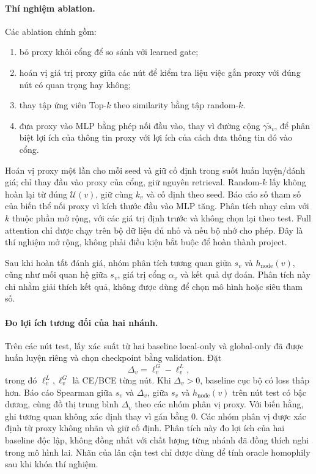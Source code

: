 \documentclass[12pt,a4paper]{article}
\numberwithin{equation}{section}
\theoremstyle{definition}
\begin{document}
\paragraph{Thí nghiệm ablation.}
Các ablation chính gồm:
\begin{enumerate}
    \item bỏ proxy khỏi cổng để so sánh với learned gate;
    \item hoán vị giá trị proxy giữa các nút để kiểm tra liệu việc gắn
    proxy với đúng nút có quan trọng hay không;
    \item thay tập ứng viên Top-$k$ theo similarity bằng tập random-$k$.
    \item đưa proxy vào MLP bằng phép nối đầu vào, thay vì đường cộng $\gamma\tilde{s}_v$, để phân biệt lợi ích của thông tin proxy với lợi ích của cách đưa thông tin đó vào cổng.
\end{enumerate}
Hoán vị proxy một lần cho mỗi seed và giữ cố định trong suốt huấn luyện/đánh giá; chỉ thay đầu vào proxy của cổng, giữ nguyên retrieval. Random-$k$ lấy không hoàn lại từ đúng $\mathcal{U}(v)$, giữ cùng $k_v$ và cố định theo seed. Báo cáo số tham số của biến thể nối proxy vì kích thước đầu vào MLP tăng. Phân tích nhạy cảm với $k$ thuộc phần mở rộng, với các giá trị định trước và không chọn lại theo test.
Full attention chỉ được chạy trên bộ dữ liệu đủ nhỏ và nếu bộ nhớ cho
phép. Đây là thí nghiệm mở rộng, không phải điều kiện bắt buộc để hoàn
thành project.

Sau khi hoàn tất đánh giá, nhóm phân tích tương quan giữa $s_v$ và
$h_{\mathrm{node}}(v)$, cũng như mối quan hệ giữa $s_v$, giá trị cổng
$\alpha_v$ và kết quả dự đoán. Phân tích này chỉ nhằm giải thích kết quả,
không được dùng để chọn mô hình hoặc siêu tham số.

\paragraph{Đo lợi ích tương đối của hai nhánh.}
Trên các nút test, lấy xác suất từ hai baseline local-only và global-only đã được huấn luyện riêng và chọn checkpoint bằng validation. Đặt
\begin{equation}
\Delta_v=\ell_v^G-\ell_v^L,
\end{equation}
trong đó $\ell_v^L,\ell_v^G$ là CE/BCE từng nút. Khi $\Delta_v>0$, baseline cục bộ có loss thấp hơn. Báo cáo Spearman giữa $s_v$ và $\Delta_v$, giữa $s_v$ và $h_{\text{node}}(v)$ trên nút test có bậc dương, cùng đồ thị trung bình $\Delta_v$ theo các nhóm phân vị proxy. Với biến hằng, ghi tương quan không xác định thay vì gán bằng $0$. Các nhóm phân vị được xác định từ proxy không nhãn và giữ cố định. Phân tích này đo lợi ích của hai baseline độc lập, không đồng nhất với chất lượng từng nhánh đã đồng thích nghi trong mô hình lai. Nhãn của lân cận test chỉ được dùng để tính oracle homophily sau khi khóa thí nghiệm.
\end{document}
